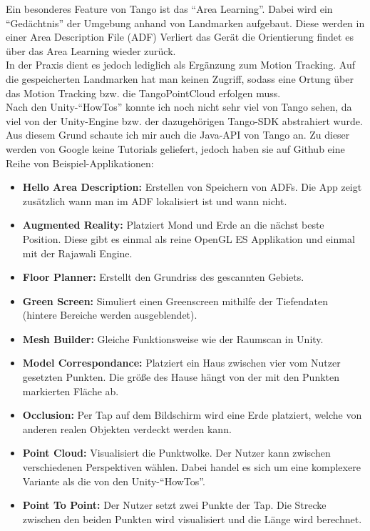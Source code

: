 Ein besonderes Feature von Tango ist das "`Area Learning"'. Dabei wird ein "`Gedächtnis"' der Umgebung anhand von Landmarken aufgebaut. Diese werden in einer Area Description File (ADF) Verliert das Gerät die Orientierung findet es über das Area Learning wieder zurück.\cite{fehling}\\
In der Praxis dient es jedoch lediglich als Ergänzung zum Motion Tracking. Auf die gespeicherten Landmarken hat man keinen Zugriff, sodass eine Ortung über das Motion Tracking bzw. die TangoPointCloud erfolgen muss.\\
Nach den Unity-"`HowTos"' konnte ich noch nicht sehr viel von Tango sehen, da viel von der Unity-Engine bzw. der dazugehörigen Tango-SDK abstrahiert wurde. Aus diesem Grund schaute ich mir auch die Java-API von Tango an. Zu dieser werden von Google keine Tutorials geliefert, jedoch haben sie auf Github eine Reihe von Beispiel-Applikationen:
\begin{itemize}
	\item\textbf{Hello Area Description:} Erstellen von Speichern von ADFs. Die App zeigt zusätzlich wann man im ADF lokalisiert ist und wann nicht.
	\item\textbf{Augmented Reality:} Platziert Mond und Erde an die nächst beste Position. Diese gibt es einmal als reine OpenGL ES Applikation und einmal mit der Rajawali Engine.
	\item\textbf{Floor Planner:} Erstellt den Grundriss des gescannten Gebiets.
	\item\textbf{Green Screen:} Simuliert einen Greenscreen mithilfe der Tiefendaten (hintere Bereiche werden ausgeblendet).
	\item\textbf{Mesh Builder:} Gleiche Funktionsweise wie der Raumscan in Unity.
	\item\textbf{Model Correspondance:} Platziert ein Haus zwischen vier vom Nutzer gesetzten Punkten. Die größe des Hause hängt von der mit den Punkten markierten Fläche ab.
	\item\textbf{Occlusion:} Per Tap auf dem Bildschirm wird eine Erde platziert, welche von anderen realen Objekten verdeckt werden kann.
	\item\textbf{Point Cloud:} Visualisiert die Punktwolke. Der Nutzer kann zwischen verschiedenen Perspektiven wählen. Dabei handel es sich um eine komplexere Variante als die von den Unity-"`HowTos"'.
	\item\textbf{Point To Point:} Der Nutzer setzt zwei Punkte der Tap. Die Strecke zwischen den beiden Punkten wird visualisiert und die Länge wird berechnet.
\end{itemize}